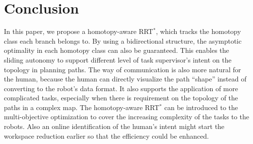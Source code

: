 \documentclass[letterpaper, 10 pt, conference]{ieeeconf}
\begin{document}
\section{Conclusion}
\label{sec:conclusion}

In this paper, we propose a homotopy-aware RRT$^{*}$, which tracks the homotopy class each branch belongs to.
By using a bidirectional structure, the asymptotic optimality in each homotopy class can also be guaranteed.
This enables the sliding autonomy to support different level of task supervisor's intent on the topology in planning paths.
The way of communication is also more natural for the human, because the human can directly visualize the path ``shape'' instead of converting to the robot's data format.
It also supports the application of more complicated tasks, especially when there is requirement on the topology of the paths in a complex map.
The homotopy-aware RRT$^{*}$ can be introduced to the multi-objective optimization to cover the increasing complexity of the tasks to the robots.
Also an online identification of the human's intent might start the workspace reduction earlier so that the efficiency could be enhanced.



\end{document}
